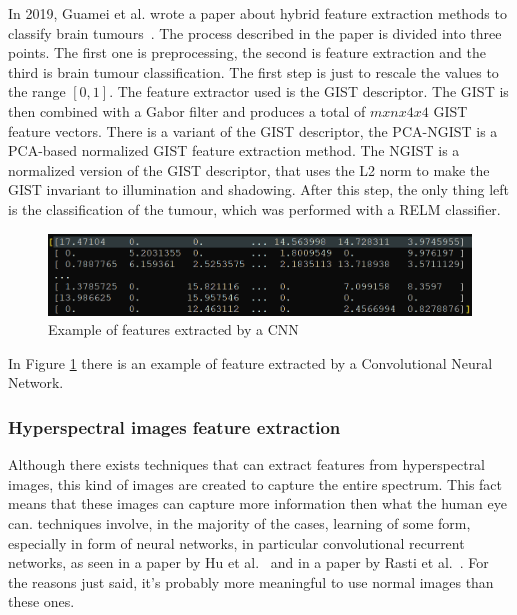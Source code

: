 \documentclass[conference]{IEEEtran}
\begin{document}
					\noindent In 2019, Guamei et al. wrote a paper about hybrid feature extraction methods to classify brain tumours~\cite{gumaei2019hybrid}. The process described in the paper is divided into three points. The 
					first one is preprocessing, the second is feature extraction and the third is brain tumour classification. The first step is just to rescale the values to the range $[0,1]$. The feature extractor 
					used is the GIST descriptor. The GIST is then combined with a Gabor filter and produces a total of $mxnx4x4$ GIST feature vectors. There is a variant of the GIST descriptor, the 
					PCA-NGIST is a PCA-based normalized GIST feature extraction method. The NGIST is a normalized version of the GIST descriptor, that uses the L2 norm to make the GIST invariant to illumination and shadowing. 
					After this step, the only thing left is the classification of the tumour, which was performed with a RELM classifier. 
					
					\begin{figure}[!ht]
						\centerline{\includegraphics[width=\linewidth]{imgs/cnn_features.png}}
						\caption{Example of features extracted by a CNN}
						\label{fig:4}
					\end{figure}	
					
					\noindent In Figure \ref{fig:4} there is an example of feature extracted by a Convolutional Neural Network. 
					
				\subsubsection{Hyperspectral images feature extraction}
					
					Although there exists techniques that can extract features from hyperspectral images, this kind of images are created to capture the entire spectrum. This fact means that these images can capture 
					more information then what the human eye can. techniques involve, in the majority of the cases, learning of some form, especially in form of neural networks, in particular convolutional recurrent 
					networks, as seen in a paper by Hu et al.~\cite{hu2020spatial} and in a paper by Rasti et al.~\cite{rasti2020feature}. For the reasons just said, it's probably more meaningful to use normal 
					images than these ones.
			
\end{document}

